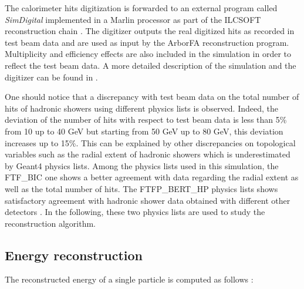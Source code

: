 \documentclass[cits]{JINST}
\begin{document}
The calorimeter hits digitization is forwarded to an external program called \emph{SimDigital} implemented in a Marlin \cite{marlin-lccd} processor as part of the ILCSOFT reconstruction chain \cite{ilcsoft}. The digitizer outputs the real digitized hits as recorded in test beam data and are used as input by the ArborFA reconstruction program. Multiplicity and efficiency effects are also included in the simulation in order to reflect the test beam data. A more detailed description of the simulation and the digitizer can be found in \cite{sdhcal-sim-digit}.

One should notice that a discrepancy with test beam data on the total number of hits of hadronic showers using different physics lists is observed. Indeed, the deviation of the number of hits with respect to test beam data is less than 5\% from 10 up to 40 GeV but starting from 50 GeV up to 80 GeV, this deviation increases up to 15\%. This can be explained by other discrepancies on topological variables such as the radial extent of hadronic showers which is underestimated by Geant4 physics lists. Among the physics lists used in this simulation, the FTF\_BIC one shows a better agreement with data regarding the radial extent as well as the total number of hits. The FTFP\_BERT\_HP physics lists shows satisfactory agreement with hadronic shower data obtained with different other detectors \cite{atlas-energy-res}. In the following, these two physics lists are used to study the reconstruction algorithm.

\subsection{Energy reconstruction}

The reconstructed energy of a single particle is computed as follows :
\end{document}
